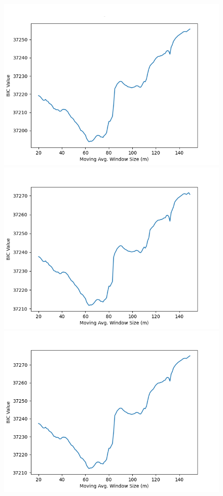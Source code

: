 \documentclass{article}
\begin{document}
\begin{figure}[!ht]
\begin{center}
\begin{spacing}{0.5}
\includegraphics[scale=0.3]{Prop_LT_Cr}
\includegraphics[scale=0.3]{LT_Cr}
\includegraphics[scale=0.3]{Prop_Both_Cr}

\end{spacing}
\end{center}
\end{figure}
\end{document}
